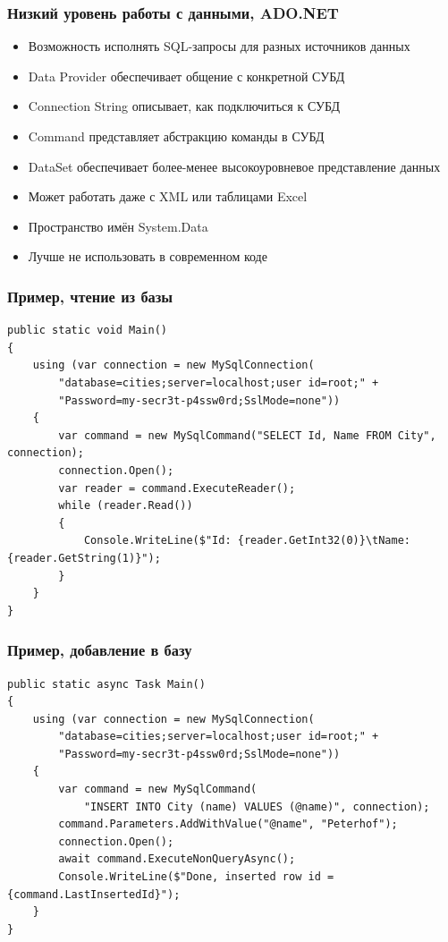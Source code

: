 \documentclass[xetex,mathserif,serif]{beamer}
\begin{document}
    \begin{frame}
        \frametitle{Низкий уровень работы с данными, ADO.NET}
        \begin{itemize}
            \item Возможность исполнять SQL-запросы для разных источников данных
            \item Data Provider обеспечивает общение с конкретной СУБД
            \item Connection String описывает, как подключиться к СУБД
            \item Command представляет абстракцию команды в СУБД
            \item DataSet обеспечивает более-менее высокоуровневое представление данных
            \item Может работать даже с XML или таблицами Excel
            \item Пространство имён System.Data
            \item Лучше не использовать в современном коде
        \end{itemize}
    \end{frame}

    \begin{frame}[fragile]
        \frametitle{Пример, чтение из базы}
        \begin{footnotesize}
            \begin{verbatim}
public static void Main()
{
    using (var connection = new MySqlConnection(
        "database=cities;server=localhost;user id=root;" + 
        "Password=my-secr3t-p4ssw0rd;SslMode=none"))
    {
        var command = new MySqlCommand("SELECT Id, Name FROM City", connection);
        connection.Open();
        var reader = command.ExecuteReader();
        while (reader.Read())
        {
            Console.WriteLine($"Id: {reader.GetInt32(0)}\tName:{reader.GetString(1)}");
        }
    }
}
            \end{verbatim}
        \end{footnotesize}
    \end{frame}

    \begin{frame}[fragile]
        \frametitle{Пример, добавление в базу}
        \begin{footnotesize}
            \begin{verbatim}
public static async Task Main()
{
    using (var connection = new MySqlConnection(
        "database=cities;server=localhost;user id=root;" +
        "Password=my-secr3t-p4ssw0rd;SslMode=none"))
    {
        var command = new MySqlCommand(
            "INSERT INTO City (name) VALUES (@name)", connection);
        command.Parameters.AddWithValue("@name", "Peterhof");
        connection.Open();
        await command.ExecuteNonQueryAsync();
        Console.WriteLine($"Done, inserted row id = {command.LastInsertedId}");
    }
}
            \end{verbatim}
        \end{footnotesize}
    \end{frame}
\end{document}
